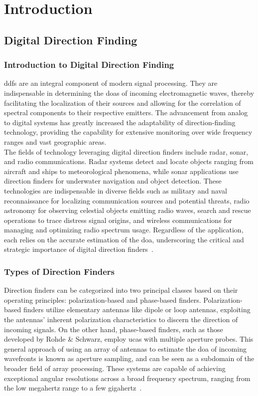 \chapter{Introduction}
\label{ch:introduction}
\section{Digital Direction Finding}

\subsection{Introduction to Digital Direction Finding}
\glspl{ddf} are an integral component of modern signal processing. They are indispensable in determining the \glspl{doa}
of incoming electromagnetic waves, thereby facilitating the localization of their sources and allowing for the
correlation of spectral components to their respective emitters.
The advancement from analog to digital systems has greatly increased the adaptability of
direction-finding technology, providing the capability for extensive monitoring over wide
frequency ranges and vast geographic areas.\\
The fields of technology leveraging digital direction finders include radar, sonar, and
radio communications. Radar systems detect and locate objects ranging from
aircraft and ships to meteorological phenomena, while sonar applications use direction
finders for underwater navigation and object detection. These technologies are indispensable
in diverse fields such as military and naval reconnaissance for localizing communication
sources and potential threats, radio astronomy for observing celestial objects emitting
radio waves, search and rescue operations to trace distress signal origins, and wireless
communications for managing and optimizing radio spectrum usage. Regardless of the application,
each relies on the accurate estimation of the \gls{doa}, underscoring the
critical and strategic importance of digital direction finders~\cite{demmel, tuncer.ch1, tuncer.ch2}.


\subsection{Types of Direction Finders}
Direction finders can be categorized into two principal classes based on their operating principles:
polarization-based and phase-based finders. Polarization-based finders utilize elementary antennas like dipole
or loop antennas, exploiting the antennas' inherent polarization characteristics to discern the direction of incoming
signals. On the other hand, phase-based finders, such as those developed by Rohde \& Schwarz, employ \glspl{uca} with
multiple aperture probes. This general approach of using an array of antennas to estimate the \gls{doa} of incoming
wavefronts is known as aperture sampling, and can be seen as a subdomain of the broader field of array processing.
These systems are capable of achieving exceptional angular resolutions across a broad frequency spectrum, ranging from
the low megahertz range to a few gigahertz~\cite{demmel}.

